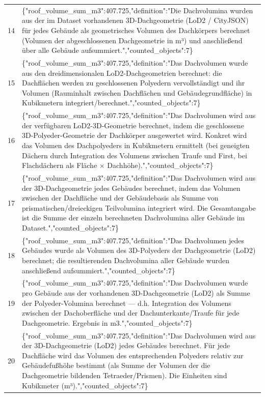 \documentclass[a4paper,11pt]{article}
\begin{document}
\begin{table}[ht]
\begin{tabular}{r p{12cm}}
14 & \{"roof\_volume\_sum\_m3":407.725,"definition":"Die Dachvolumina wurden aus der im Dataset vorhandenen 3D-Dachgeometrie (LoD2 / CityJSON) für jedes Gebäude als geometrisches Volumen des Dachkörpers berechnet (Volumen der abgeschlossenen Dachgeometrie in m³) und anschließend über alle Gebäude aufsummiert.","counted\_objects":7\} \\
15 & \{"roof\_volume\_sum\_m3":407.725,"definition":"Das Dachvolumen wurde aus den dreidimensionalen LoD2-Dachgeometrien berechnet: die Dachflächen werden zu geschlossenen Polyedern vervollständigt und ihr Volumen (Rauminhalt zwischen Dachflächen und Gebäudegrundfläche) in Kubikmetern integriert/berechnet.","counted\_objects":7\} \\
16 & \{"roof\_volume\_sum\_m3":407.725,"definition":"Das Dachvolumen wird aus der verfügbaren LoD2-3D-Geometrie berechnet, indem die geschlossene 3D-Polyeder-Geometrie der Dachkörper ausgewertet wird. Konkret wird das Volumen des Dachpolyeders in Kubikmetern ermittelt (bei geneigten Dächern durch Integration des Volumens zwischen Traufe und First, bei Flachdächern als Fläche × Dachhöhe).","counted\_objects":7\} \\
17 & \{"roof\_volume\_sum\_m3":407.725,"definition":"Das Dachvolumen wird aus der 3D-Dachgeometrie jedes Gebäudes berechnet, indem das Volumen zwischen der Dachfläche und der Gebäudebasis als Summe von prismatischen/dreieckigen Teilvolumina integriert wird. Die Gesamtangabe ist die Summe der einzeln berechneten Dachvolumina aller Gebäude im Dataset.","counted\_objects":7\} \\
18 & \{"roof\_volume\_sum\_m3":407.725,"definition":"Das Dachvolumen jedes Gebäudes wurde als Volumen des 3D-Polyeders der Dachgeometrie (LoD2) berechnet; die resultierenden Dachvolumina aller Gebäude wurden anschließend aufsummiert.","counted\_objects":7\} \\
19 & \{"roof\_volume\_sum\_m3":407.725,"definition":"Das Dachvolumen wurde pro Gebäude aus der vorhandenen 3D-Dachgeometrie (LoD2) als Summe der Polyeder-Volumina berechnet — d.h. Integration des Volumens zwischen der Dachoberfläche und der Dachunterkante/Traufe für jede Dachgeometrie. Ergebnis in m3.","counted\_objects":7\} \\
20 & \{"roof\_volume\_sum\_m3":407.725,"definition":"Das Dachvolumen wird aus der 3D-Dachgeometrie (LoD2) jedes Gebäudes berechnet. Für jede Dachfläche wird das Volumen des entsprechenden Polyeders relativ zur Gebäudefußhöhe bestimmt (als Summe der Volumen der die Dachgeometrie bildenden Tetraeder/Prismen). Die Einheiten sind Kubikmeter (m³).","counted\_objects":7\} \\
\hline
\end{tabular}
\end{table}
\end{document}
